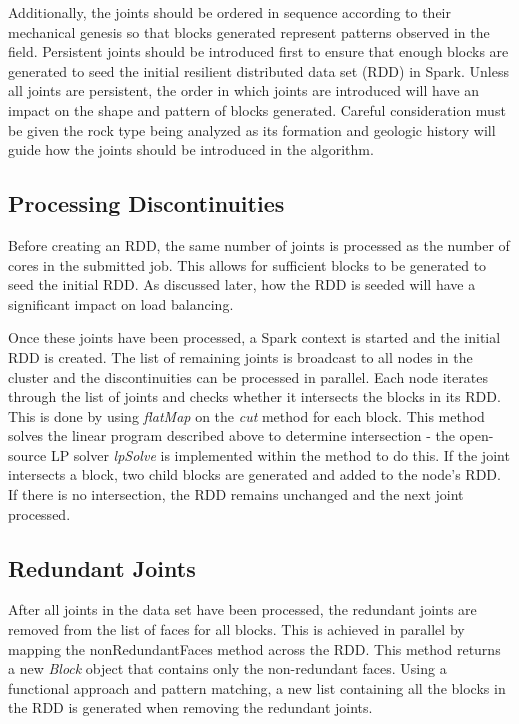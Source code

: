 Additionally, the joints should be ordered in sequence according to their mechanical genesis so that blocks generated represent patterns observed in the field. Persistent joints should be introduced first to ensure that enough blocks are generated to seed the initial resilient distributed data set (RDD) in Spark. Unless all joints are persistent, the order in which joints are introduced will have an impact on the shape and pattern of blocks generated. Careful consideration must be given the rock type being analyzed as its formation and geologic history will guide how the joints should be introduced in the algorithm. \par

\subsection{Processing Discontinuities}
Before creating an RDD, the same number of joints is processed as the number of cores in the submitted job. This allows for sufficient blocks to be generated to seed the initial RDD. As discussed later, how the RDD is seeded will have a significant impact on load balancing. \par

Once these joints have been processed, a Spark context is started and the initial RDD is created. The list of remaining joints is broadcast to all nodes in the cluster and the discontinuities can be processed in parallel. Each node iterates through the list of joints and checks whether it intersects the blocks in its RDD. This is done by using \textit{flatMap} on the \textit{cut} method for each block. This method solves the linear program described above to determine intersection - the open-source LP solver \textit{lpSolve} is implemented within the method to do this. If the joint intersects a block, two child blocks are generated and added to the node's RDD. If there is no intersection, the RDD remains unchanged and the next joint processed.

\subsection{Redundant Joints}
After all joints in the data set have been processed, the redundant joints are removed from the list of faces for all blocks. This is achieved in parallel by mapping the nonRedundantFaces method across the RDD. This method returns a new \textit{Block} object that contains only the non-redundant faces. Using a functional approach and pattern matching, a new list containing all the blocks in the RDD is generated when removing the redundant joints.

